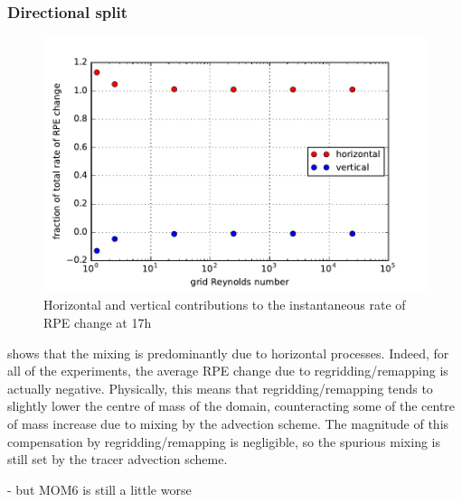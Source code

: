 \subsubsection{Directional split}
\begin{figure}
  \includegraphics{../plots/lock_exchange_drpe_split.pdf}
  \caption{\label{fig:lock-rpesplit} Horizontal and vertical contributions to the instantaneous rate of RPE change at 17h}
\end{figure}

 shows that the mixing is predominantly due to horizontal processes. Indeed, for all of the experiments, the average RPE change due to regridding/remapping is actually negative. Physically, this means that regridding/remapping tends to slightly lower the centre of mass of the domain, counteracting some of the centre of mass increase due to mixing by the advection scheme. The magnitude of this compensation by regridding/remapping is negligible, so the spurious mixing is still set by the tracer advection scheme.

- but MOM6 is still a little worse
